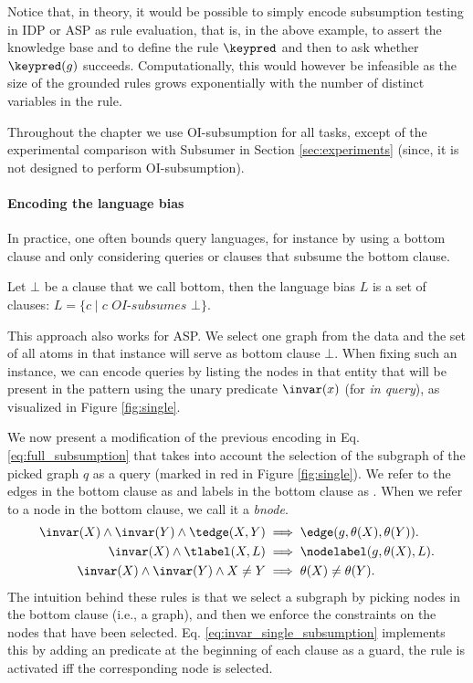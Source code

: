 Notice that, in theory, it would be possible to simply encode subsumption testing 
in IDP or ASP as rule evaluation, that is, in the above example, to assert the knowledge base and to define the rule $\keypred$ and then to ask whether $\keypred(g)$ succeeds. 
Computationally, this would however be infeasible as the size of the grounded rules 
grows exponentially with the number of distinct variables in the rule.

Throughout the chapter we use OI-subsumption for all tasks, except of the experimental comparison with Subsumer in Section \ref{sec:experiments} (since, it is not designed to perform OI-subsumption).

\paragraph{Encoding the language bias}
In practice, one often bounds query languages, for instance by using a bottom clause and only considering queries or clauses that subsume the bottom clause. 

\begin{definition}
  Let $\bot$ be a clause that we call bottom, then the language bias $L$ is a set of clauses: $L = \{ c \mid c \textit{ OI-subsumes } \bot\}$.
\end{definition}

This approach also works for ASP. We select one graph from the data and the set of all atoms in that instance will serve as bottom clause $\bot$. When fixing such an instance, we can encode queries by listing the nodes in that entity that will be present in the pattern using the unary predicate $\invar(x)$ (for \textit{in query}), as visualized in Figure \ref{fig:single}.

We now present a modification of the previous encoding in Eq. \ref{eq:full_subsumption} that takes into account the selection of the subgraph of the picked graph $q$ as a query (marked in red in Figure \ref{fig:single}). We refer to the edges in the bottom clause as \tedge and labels in the bottom clause as \tlabel. When we refer to a node in the bottom clause, we call it a \textit{bnode}.
\begin{equation}
\begin{aligned}
  \invar(X) \wedge \invar(Y) \wedge \tedge(X,Y) &\implies \edge(g,\theta(X), \theta(Y)).  \\
  \invar(X) \wedge \tlabel(X,L) &\implies \nodelabel(g,\theta(X),L). \\
  \invar(X) \wedge \invar(Y) \wedge X \neq Y &\implies \theta(X) \neq \theta(Y).
\end{aligned}
  \label{eq:invar_single_subsumption}
\end{equation}
The intuition behind these rules is that we select a subgraph by picking nodes in the bottom clause (i.e., a graph), and then we enforce the constraints on the nodes that have been selected. Eq. \ref{eq:invar_single_subsumption} implements this by adding an \invar predicate at the beginning of each clause as a guard, the rule is activated iff the corresponding node is selected.
\
